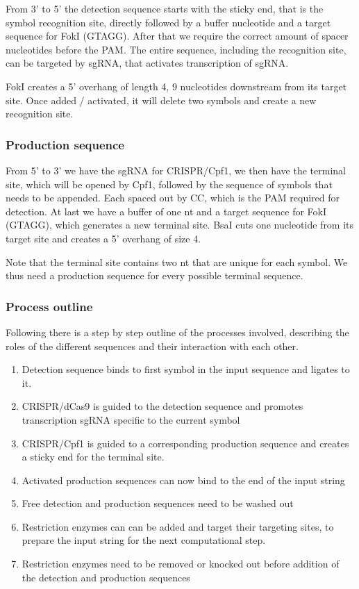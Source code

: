 \documentclass[
11pt, %
a4paper, %
oneside, %
headinclude,footinclude, %
BCOR5mm, %
]{scrartcl}
\begin{document}
From 3' to 5' the detection sequence starts with the sticky end, that is the
symbol recognition site, directly followed by a buffer nucleotide and a target sequence
for FokI (GTAGG). After that we require the correct amount of spacer
nucleotides before the PAM. The entire sequence, including the recognition site,
can be targeted by sgRNA, that activates transcription of sgRNA.

FokI creates a 5' overhang of length 4, 9 nucleotides downstream from its
target site. Once added / activated, it will delete two symbols and create a new
recognition site.

\subsubsection{Production sequence}

From 5' to 3' we have the sgRNA for CRISPR/Cpf1, we then have the terminal site,
which will be opened by Cpf1, followed by the sequence of symbols that needs to
be appended. Each spaced out by CC, which is the PAM required for detection. At
last we have a buffer of one nt and a target sequence for FokI (GTAGG), which
generates a new terminal site. BsaI cuts one nucleotide from its target site and
creates a 5' overhang of size 4.

Note that the terminal site contains two nt that are unique for each symbol. We
thus need a production sequence for every possible terminal sequence. 

\subsubsection{Process outline}

Following there is a step by step outline of the processes involved, describing
the roles of the different sequences and their interaction with each other.
\begin{enumerate}
  \item Detection sequence binds to first symbol in the input sequence and
    ligates to it.
  \item CRISPR/dCas9 is guided to the detection sequence and promotes
    transcription sgRNA specific to the current symbol
  \item CRISPR/Cpf1 is guided to a corresponding production sequence and creates
    a sticky end for the terminal site.
  \item Activated production sequences can now bind to the end of the input
    string
  \item Free detection and production sequences need to be washed out
  \item Restriction enzymes can can be added and target their targeting sites,
    to prepare the input string for the next computational step.
  \item Restriction enzymes need to be removed or knocked out before addition of
    the detection and production sequences
\end{enumerate}
\end{document}
